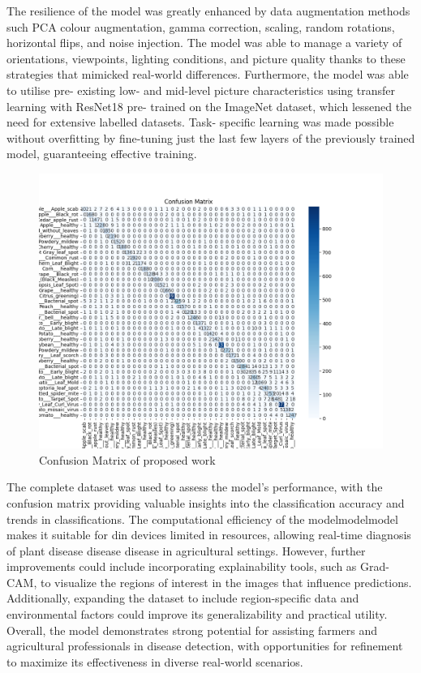 \documentclass[conference]{IEEEtran}
\begin{document}
The resilience of the model was greatly enhanced by data augmentation methods such PCA colour augmentation, gamma correction, scaling, random rotations, horizontal flips, and noise injection. The model was able to manage a variety of orientations, viewpoints, lighting conditions, and picture quality thanks to these strategies that mimicked real-world differences. Furthermore, the model was able to utilise pre- existing low- and mid-level picture characteristics using transfer learning with ResNet18 pre- trained on the ImageNet dataset, which lessened the need for extensive labelled datasets. Task- specific learning was made possible without overfitting by fine-tuning just the last few layers of the previously trained model, guaranteeing effective training.

\begin{figure}
    \centering
    \includegraphics[width=1\linewidth]{confusion_matrix.png}
    \caption{Confusion Matrix of proposed work}
    \label{fig:enter-label}
\end{figure}
The complete dataset was used to assess the model's performance, with the confusion matrix providing valuable insights into the classification accuracy and trends in classifications. 
The computational efficiency of the modelmodelmodel makes it suitable for din devices limited in resources, allowing real-time diagnosis of plant disease disease disease in agricultural settings. However, further improvements could include incorporating explainability tools, such as Grad- CAM, to visualize the regions of interest in the images that influence predictions. Additionally, expanding the dataset to include region-specific data and environmental factors could improve its generalizability and practical utility. Overall, the model demonstrates strong potential for assisting farmers and agricultural professionals in disease detection, with opportunities for refinement to maximize its effectiveness in diverse real-world scenarios.
\end{document}
